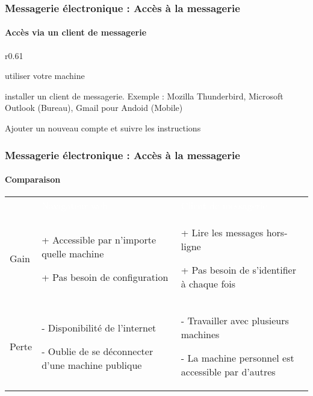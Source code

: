 \documentclass[xcolor=table]{beamer}
\begin{document}
\begin{frame}
\frametitle{Messagerie électronique : Accès à la messagerie}
\framesubtitle{Accès via un client de messagerie}

\begin{wrapfigure}{r}{0.61\textwidth}
	\vspace{-1cm}
\end{wrapfigure}

\mysphere utiliser votre machine

\mysphere installer un client de messagerie. Exemple : Mozilla Thunderbird, Microsoft Outlook (Bureau), Gmail pour Andoid (Mobile)

\mysphere Ajouter un nouveau compte et suivre les instructions 


\end{frame}

\begin{frame}
\frametitle{Messagerie électronique : Accès à la messagerie}
\framesubtitle{Comparaison}

\begin{tabular}{p{}p{}p{}}
	\rowcolor{darkblue}
	& \textcolor{white}{Navigateur web} & \textcolor{white}{Client de messagerie} \\
	
	Gain &
	+ Accessible par n'importe quelle machine
	
	+ Pas besoin de configuration
	
	& 
	+ Lire les messages hors-ligne
	
	+ Pas besoin de s'identifier à chaque fois
	\\
	
	Perte &
	- Disponibilité de l'internet
	
	- Oublie de se déconnecter d'une machine publique
	&
	- Travailler avec plusieurs machines
	
	- La machine personnel est accessible par d'autres
	\\
\end{tabular}

\end{frame}
\end{document}
